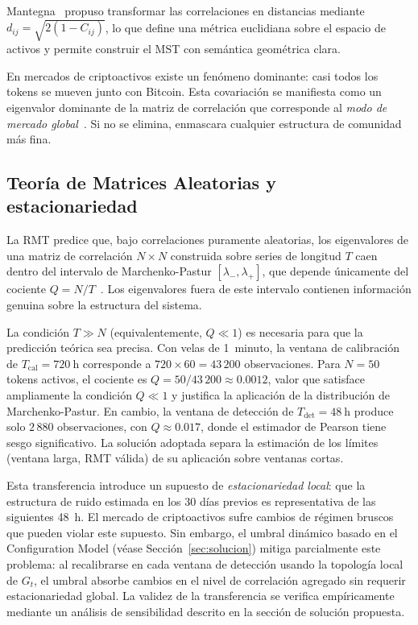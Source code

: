Mantegna~\cite{mantegna1999} propuso transformar las correlaciones en
distancias mediante $d_{ij} = \sqrt{2(1 - C_{ij})}$, lo que define una
métrica euclidiana sobre el espacio de activos y permite construir el
MST con semántica geométrica clara.

En mercados de criptoactivos existe un fenómeno dominante: casi todos los
tokens se mueven junto con Bitcoin. Esta covariación se manifiesta como
un eigenvalor dominante de la matriz de correlación que corresponde al
\emph{modo de mercado global}~\cite{plerou1999}. Si no se elimina,
enmascara cualquier estructura de comunidad más fina.

\subsection{Teoría de Matrices Aleatorias y estacionariedad}

La RMT predice que, bajo correlaciones puramente aleatorias, los
eigenvalores de una matriz de correlación $N \times N$ construida sobre
series de longitud $T$ caen dentro del intervalo de Marchenko-Pastur
$[\lambda_-, \lambda_+]$, que depende únicamente del cociente $Q =
N/T$~\cite{plerou1999}. Los eigenvalores fuera de este intervalo
contienen información genuina sobre la estructura del sistema.

La condición $T \gg N$ (equivalentemente, $Q \ll 1$) es necesaria para
que la predicción teórica sea precisa. Con velas de 1~minuto, la ventana
de calibración de $T_{\text{cal}} = 720~\text{h}$ corresponde a
$720 \times 60 = 43\,200$ observaciones. Para $N = 50$ tokens activos,
el cociente es $Q = 50/43\,200 \approx 0.0012$, valor que satisface
ampliamente la condición $Q \ll 1$ y justifica la aplicación de la
distribución de Marchenko-Pastur. En cambio, la ventana de detección de
$T_{\text{det}} = 48~\text{h}$ produce solo $2\,880$ observaciones,
con $Q \approx 0.017$, donde el estimador de Pearson tiene sesgo
significativo. La solución adoptada separa la estimación de los límites
(ventana larga, RMT válida) de su aplicación sobre ventanas cortas.

Esta transferencia introduce un supuesto de \emph{estacionariedad local}:
que la estructura de ruido estimada en los 30 días previos es
representativa de las siguientes 48~h. El mercado de criptoactivos sufre
cambios de régimen bruscos que pueden violar este supuesto. Sin embargo,
el umbral dinámico basado en el Configuration Model (véase
Sección~\ref{sec:solucion}) mitiga parcialmente este problema: al
recalibrarse en cada ventana de detección usando la topología local de
$G_t$, el umbral absorbe cambios en el nivel de correlación agregado sin
requerir estacionariedad global. La validez de la transferencia se
verifica empíricamente mediante un análisis de sensibilidad descrito en
la sección de solución propuesta.

